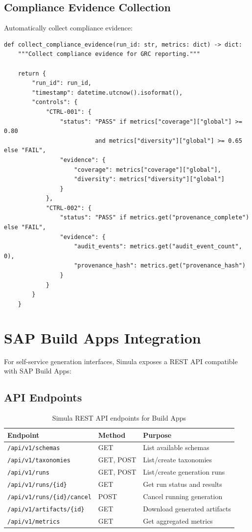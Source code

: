\subsection{Compliance Evidence Collection}

Automatically collect compliance evidence:

\begin{lstlisting}[language=jsonx,caption={GRC evidence collection}]
def collect_compliance_evidence(run_id: str, metrics: dict) -> dict:
    """Collect compliance evidence for GRC reporting."""
    
    return {
        "run_id": run_id,
        "timestamp": datetime.utcnow().isoformat(),
        "controls": {
            "CTRL-001": {
                "status": "PASS" if metrics["coverage"]["global"] >= 0.80 
                          and metrics["diversity"]["global"] >= 0.65 else "FAIL",
                "evidence": {
                    "coverage": metrics["coverage"]["global"],
                    "diversity": metrics["diversity"]["global"]
                }
            },
            "CTRL-002": {
                "status": "PASS" if metrics.get("provenance_complete") else "FAIL",
                "evidence": {
                    "audit_events": metrics.get("audit_event_count", 0),
                    "provenance_hash": metrics.get("provenance_hash")
                }
            }
        }
    }
\end{lstlisting}


\section{SAP Build Apps Integration}

For self-service generation interfaces, Simula exposes a REST API compatible
with SAP Build Apps:

\subsection{API Endpoints}

\begin{table}[H]
\centering
\caption{Simula REST API endpoints for Build Apps}
\label{tab:api-endpoints}
\footnotesize
\begin{tabularx}{\textwidth}{@{}l l X@{}}
\toprule
\textbf{Endpoint} & \textbf{Method} & \textbf{Purpose} \\
\midrule
\texttt{/api/v1/schemas} & GET & List available schemas \\
\texttt{/api/v1/taxonomies} & GET, POST & List/create taxonomies \\
\texttt{/api/v1/runs} & GET, POST & List/create generation runs \\
\texttt{/api/v1/runs/\{id\}} & GET & Get run status and results \\
\texttt{/api/v1/runs/\{id\}/cancel} & POST & Cancel running generation \\
\texttt{/api/v1/artifacts/\{id\}} & GET & Download generated artifacts \\
\texttt{/api/v1/metrics} & GET & Get aggregated metrics \\
\bottomrule
\end{tabularx}
\end{table}


